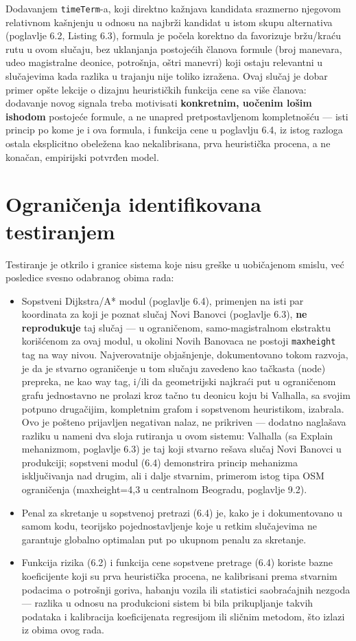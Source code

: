 Dodavanjem \texttt{timeTerm}-a, koji direktno kažnjava kandidata srazmerno njegovom relativnom kašnjenju u odnosu na najbrži kandidat u istom skupu alternativa (poglavlje 6.2, Listing 6.3), formula je počela korektno da favorizuje bržu/kraću rutu u ovom slučaju, bez uklanjanja postojećih članova formule (broj manevara, udeo magistralne deonice, potrošnja, oštri manevri) koji ostaju relevantni u slučajevima kada razlika u trajanju nije toliko izražena. Ovaj slučaj je dobar primer opšte lekcije o dizajnu heurističkih funkcija cene sa više članova: dodavanje novog signala treba motivisati \textbf{konkretnim, uočenim lošim ishodom} postojeće formule, a ne unapred pretpostavljenom kompletnošću — isti princip po kome je i ova formula, i funkcija cene u poglavlju 6.4, iz istog razloga ostala eksplicitno obeležena kao nekalibrisana, prva heuristička procena, a ne konačan, empirijski potvrđen model.

\section{Ograničenja identifikovana testiranjem}

Testiranje je otkrilo i granice sistema koje nisu greške u uobičajenom smislu, već posledice svesno odabranog obima rada:

\begin{itemize}
\item Sopstveni Dijkstra/A* modul (poglavlje 6.4), primenjen na isti par koordinata za koji je poznat slučaj Novi Banovci (poglavlje 6.3), \textbf{ne reprodukuje} taj slučaj — u ograničenom, samo-magistralnom ekstraktu korišćenom za ovaj modul, u okolini Novih Banovaca ne postoji \texttt{maxheight} tag na way nivou. Najverovatnije objašnjenje, dokumentovano tokom razvoja, je da je stvarno ograničenje u tom slučaju zavedeno kao tačkasta (node) prepreka, ne kao way tag, i/ili da geometrijski najkraći put u ograničenom grafu jednostavno ne prolazi kroz tačno tu deonicu koju bi Valhalla, sa svojim potpuno drugačijim, kompletnim grafom i sopstvenom heuristikom, izabrala. Ovo je pošteno prijavljen negativan nalaz, ne prikriven — dodatno naglašava razliku u nameni dva sloja rutiranja u ovom sistemu: Valhalla (sa Explain mehanizmom, poglavlje 6.3) je taj koji stvarno rešava slučaj Novi Banovci u produkciji; sopstveni modul (6.4) demonstrira princip mehanizma isključivanja nad drugim, ali i dalje stvarnim, primerom istog tipa OSM ograničenja (maxheight=4,3 u centralnom Beogradu, poglavlje 9.2).
\item Penal za skretanje u sopstvenoj pretrazi (6.4) je, kako je i dokumentovano u samom kodu, teorijsko pojednostavljenje koje u retkim slučajevima ne garantuje globalno optimalan put po ukupnom penalu za skretanje.
\item Funkcija rizika (6.2) i funkcija cene sopstvene pretrage (6.4) koriste bazne koeficijente koji su prva heuristička procena, ne kalibrisani prema stvarnim podacima o potrošnji goriva, habanju vozila ili statistici saobraćajnih nezgoda — razlika u odnosu na produkcioni sistem bi bila prikupljanje takvih podataka i kalibracija koeficijenata regresijom ili sličnim metodom, što izlazi iz obima ovog rada.
\end{itemize}

\clearpage
